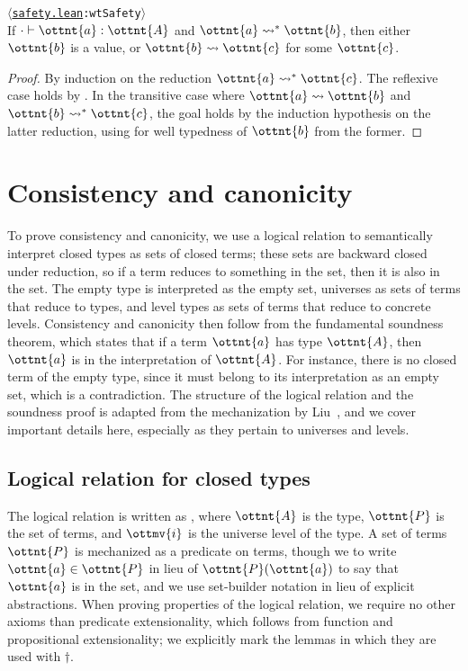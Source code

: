 \documentclass[a4paper,UKenglish,cleveref,autoref,thm-restate]{lipics-v2021}
\newcommand{\citep}[1]{\cite{#1}}
\newcommand{\repo}{https://github.com/ionathanch/TTBFL}
\newcommand{\thmref}[2]{%
  $\langle$\href{\repo/tree/main/src/#1}{\texttt{#1}}\texttt{:#2}$\rangle$%
}
\begin{document}
\begin{theorem} \thmref{safety.lean}{wtSafety} \\
  If $  \cdot   \vdash  \ottnt{a}  \mathrel{:}  \ottnt{A} $ and $ \ottnt{a}  \rightsquigarrow^\ast  \ottnt{b} $,
  then either $\ottnt{b}$ is a value,
  or $ \ottnt{b}  \rightsquigarrow  \ottnt{c} $ for some $\ottnt{c}$.
\end{theorem}

\begin{proof}
  By induction on the reduction $ \ottnt{a}  \rightsquigarrow^\ast  \ottnt{c} $.
  The reflexive case holds by .
  In the transitive case where $ \ottnt{a}  \rightsquigarrow  \ottnt{b} $ and $ \ottnt{b}  \rightsquigarrow^\ast  \ottnt{c} $,
  the goal holds by the induction hypothesis on the latter reduction,
  using  for well typedness of $\ottnt{b}$
  from the former.
\end{proof}
\fi

\section{Consistency and canonicity} \label{sec:lr}

To prove consistency and canonicity,
we use a logical relation to semantically interpret closed types as sets of closed terms;
these sets are backward closed under reduction,
so if a term reduces to something in the set, then it is also in the set.
The empty type is interpreted as the empty set,
universes as sets of terms that reduce to types,
and level types as sets of terms that reduce to concrete levels.
Consistency and canonicity then follow from the fundamental soundness theorem,
which states that if a term $\ottnt{a}$ has type $\ottnt{A}$,
then $\ottnt{a}$ is in the interpretation of $\ottnt{A}$.
For instance, there is no closed term of the empty type,
since it must belong to its interpretation as an empty set, which is a contradiction.
The structure of the logical relation and the soundness proof
is adapted from the mechanization by Liu~\citep{lr-pearl},
and we cover important details here,
especially as they pertain to universes and levels.

\subsection{Logical relation for closed types}

The logical relation is written as ,
where $\ottnt{A}$ is the type, $\ottnt{P}$ is the set of terms,
and $\ottmv{i}$ is the universe level of the type.
A set of terms $\ottnt{P}$ is mechanized as a predicate on terms,
though we to write $ \ottnt{a}  \in  \ottnt{P} $ in lieu of $\ottnt{P}(\ottnt{a})$
to say that $\ottnt{a}$ is in the set,
and we use set-builder notation in lieu of explicit abstractions.
When proving properties of the logical relation,
we require no other axioms than predicate extensionality,
which follows from function and propositional extensionality;
we explicitly mark the lemmas in which they are used with $\dagger$.
\end{document}
